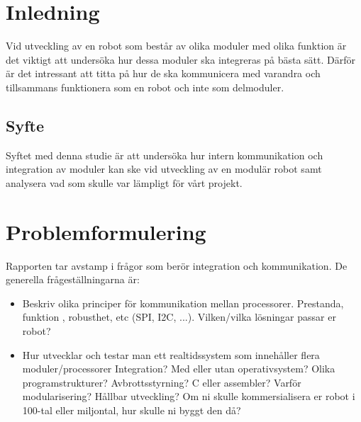 \documentclass[11pt]{article}
\begin{document}
\begin{flushleft}

\section{Inledning}
Vid utveckling av en robot som består av olika moduler med olika funktion är det viktigt att undersöka hur dessa moduler ska integreras på bästa sätt. Därför är det intressant att titta på hur de ska kommunicera med varandra och tillsammans funktionera som en robot och inte som delmoduler. 


\subsection{Syfte}
Syftet med denna studie är att undersöka hur intern kommunikation och integration av moduler kan ske vid utveckling av en modulär robot samt analysera vad som skulle var lämpligt för vårt projekt. 


\pagebreak

\section{Problemformulering}

Rapporten tar avstamp i frågor som berör integration och kommunikation. De generella frågeställningarna är:

\begin{itemize}
	\item Beskriv olika principer för kommunikation mellan processorer. Prestanda, funktion , 
robusthet, etc (SPI, I2C, ...). Vilken/vilka lösningar passar er robot?  
	\item Hur utvecklar och testar man ett realtidssystem som innehåller flera moduler/processorer Integration? Med eller utan operativsystem? Olika programstrukturer? Avbrottsstyrning? C eller assembler? Varför modularisering? Hållbar utveckling? Om ni skulle kommersialisera er robot i 100-tal eller miljontal, hur skulle ni byggt den då? 
\end{itemize}


\end{flushleft}
\end{document}
